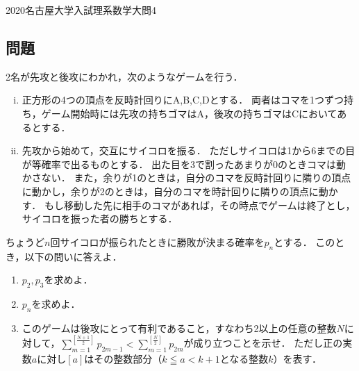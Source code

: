 \documentclass{jsarticle}
\begin{document}
\begin{center}
	{\large 2020名古屋大学入試理系数学大問4}
\end{center}
\subsection*{問題}
2名が先攻と後攻にわかれ，次のようなゲームを行う．
\begin{enumerate}[(i)]
	\item 正方形の4つの頂点を反時計回りにA,B,C,Dとする．
				両者はコマを1つずつ持ち，ゲーム開始時には先攻の持ちゴマはA，後攻の持ちゴマはCにおいてあるとする．
	\item 先攻から始めて，交互にサイコロを振る．
				ただしサイコロは1から6までの目が等確率で出るものとする．
				出た目を3で割ったあまりが0のときコマは動かさない．
				また，余りが1のときは，自分のコマを反時計回りに隣りの頂点に動かし，余りが2のときは，自分のコマを時計回りに隣りの頂点に動かす．
				もし移動した先に相手のコマがあれば，その時点でゲームは終了とし，サイコロを振った者の勝ちとする．
\end{enumerate}
ちょうど$n$回サイコロが振られたときに勝敗が決まる確率を$p_n$とする．
このとき，以下の問いに答えよ．
\begin{enumerate}[(1)]
	\item $p_2,p_3$を求めよ．
	\item $p_n$を求めよ．
	\item このゲームは後攻にとって有利であること，すなわち2以上の任意の整数$N$に対して，$\displaystyle \sum_{m=1}^{[\frac{N+1}{2}]}p_{2m-1}<\sum_{m=1}^{[\frac{N}{2}]}p_{2m}$が成り立つことを示せ．
				ただし正の実数$a$に対し$[a]$はその整数部分（$k\leqq a<k+1$となる整数$k$）を表す．
\end{enumerate}
\end{document}

